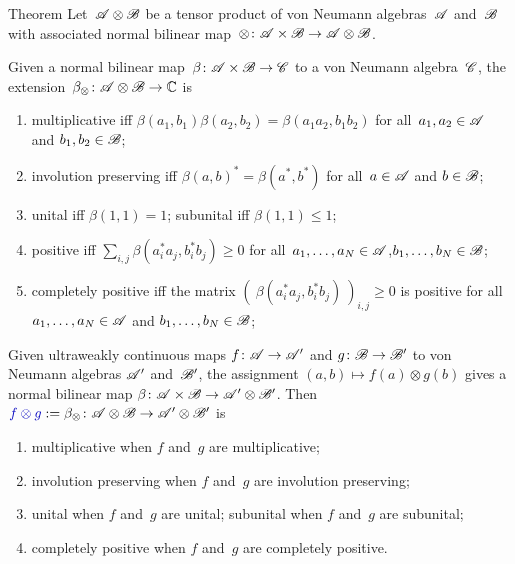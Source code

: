 \documentclass[a]{subfiles}
\begin{document}
\begin{parsec}%
\begin{point}{Theorem}%
Let~$\mathscr{A}\otimes \mathscr{B}$
be a tensor product of von Neumann algebras~$\mathscr{A}$
and~$\mathscr{B}$
with associated normal bilinear map~$\otimes\colon \mathscr{A}\times \mathscr{B}
\to \mathscr{A}\otimes \mathscr{B}$.

Given a normal bilinear map~$\beta\colon \mathscr{A}\times \mathscr{B}\to\mathscr{C}$
to a von Neumann algebra~$\mathscr{C}$,
the extension~$\beta_\otimes\colon \mathscr{A}\otimes\mathscr{B}\to\mathbb{C}$
is
\begin{enumerate}
\item
multiplicative
iff $\beta(a_1,b_1)\beta(a_2,b_2)=\beta(a_1a_2,b_1b_2)$
for all~$a_1,a_2\in\mathscr{A}$ and $b_1,b_2\in\mathscr{B}$;
\item
involution preserving
iff $\beta(a,b)^* = \beta(a^*,b^*)$ for all~$a\in\mathscr{A}$
and $b\in\mathscr{B}$;
\item
unital iff $\beta(1,1)=1$;
subunital iff $\beta(1,1)\leq 1$;
\item
positive iff 
$\sum_{i,j} \beta(a_i^*a_j,b_i^*b_j) \geq 0$
for all~$a_1,\dotsc,a_N\in\mathscr{A}$,$b_1,\dotsc,b_N\in\mathscr{B}$;
\item
completely positive iff 
the matrix $(\ \beta(a_i^*a_j,b_i^*b_j)\ )_{i,j}\geq 0$
is positive
for all~$a_1,\dotsc,a_N\in\mathscr{A}$
and $b_1,\dotsc,b_N\in\mathscr{B}$;
\end{enumerate}
Given ultraweakly continuous maps $f\colon \mathscr{A}\to\mathscr{A}'$
and $g\colon \mathscr{B}\to\mathscr{B}'$
to von Neumann algebras $\mathscr{A}'$ and~$\mathscr{B}'$,
the assignment $(a,b)\mapsto f(a)\otimes g(b)$
gives a normal bilinear map 
$\beta\colon \mathscr{A}\times \mathscr{B}\to \mathscr{A}'\otimes \mathscr{B}'$.
Then $\Define{f\otimes g}:=\beta_\otimes\colon \scrA\otimes \scrB
\to\scrA'\otimes \scrB'$
is
\begin{enumerate}
\item multiplicative
when $f$ and~$g$ are multiplicative;
\item involution preserving
when $f$ and~$g$ are involution preserving;
\item unital when $f$ and~$g$ are unital;
	subunital when $f$ and~$g$ are subunital;
\item completely positive when $f$ and~$g$ are completely positive.
\end{enumerate}
\end{point}
\end{parsec}
\end{document}
